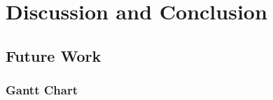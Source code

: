 \chapter{Discussion and Conclusion} \label{discussion_and_conclusion}
    \section{Future Work} \label{future_work}
        \blindtext
        
        \subsection{Gantt Chart} \label{gantt_chart}
            \blindtext
